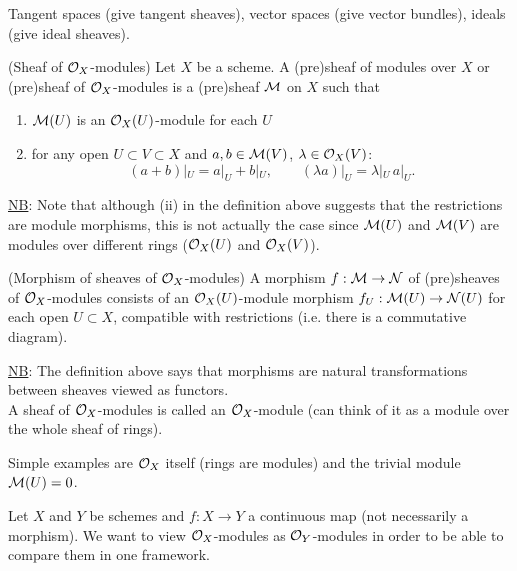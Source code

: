 \documentclass[a4paper,11pt]{article}
\begin{document}
			\begin{eg}
				Tangent spaces (give tangent sheaves), vector spaces (give vector bundles), ideals (give ideal sheaves).
			\end{eg}

			\begin{defi}(Sheaf of $\mathcal{O}_X$-modules)
				Let $X$ be a scheme. A (pre)sheaf of modules over $X$ or (pre)sheaf of $\mathcal{O}_X$-modules is a (pre)sheaf $\mathcal{M}$ on $X$ such that
				\begin{enumerate}
					\item $\mathcal{M}(U)$ is an $\mathcal{O}_X(U)$-module for each $U$
					\item for any open $U\subset V\subset X$ and $a,b\in\mathcal{M}(V)$, $\lambda\in\mathcal{O}_X(V)$:
						\begin{equation*}
							(a+b)|_U=a|_U+b|_U,\qquad (\lambda a)|_U=\lambda|_U\,a|_U. 
						\end{equation*}
				\end{enumerate}
			\end{defi}

			\noindent\underline{NB}: Note that although (ii) in the definition above suggests that the restrictions are module morphisms, this is not actually the case since $\mathcal{M}(U)$ and $\mathcal{M}(V)$ are modules over different rings ($\mathcal{O}_X(U)$ and $\mathcal{O}_X(V)$).

			\begin{defi}(Morphism of sheaves of $\mathcal{O}_X$-modules)
				A morphism $f:\mathcal{M}\rightarrow\mathcal{N}$ of (pre)sheaves of $\mathcal{O}_X$-modules consists of an $\mathcal{O}_X(U)$-module morphism $f_U:\mathcal{M}(U)\rightarrow\mathcal{N}(U)$ for each open $U\subset X$, compatible with restrictions (i.e. there is a commutative diagram).
			\end{defi}

			\noindent\underline{NB}: The definition above says that morphisms are natural transformations between sheaves viewed as functors.
			\\

			\noindent A sheaf of $\mathcal{O}_X$-modules is called an $\mathcal{O}_X$-module (can think of it as a module over the whole sheaf of rings).

			\begin{eg}
				Simple examples are $\mathcal{O}_X$ itself (rings are modules) and the trivial module $\mathcal{M}(U)=0$. 
			\end{eg}

			Let $X$ and $Y$ be schemes and $f:X\rightarrow Y$ a continuous map (not necessarily a morphism). We want to view $\mathcal{O}_X$-modules as $\mathcal{O}_Y$-modules in order to be able to compare them in one framework.
\end{document}
